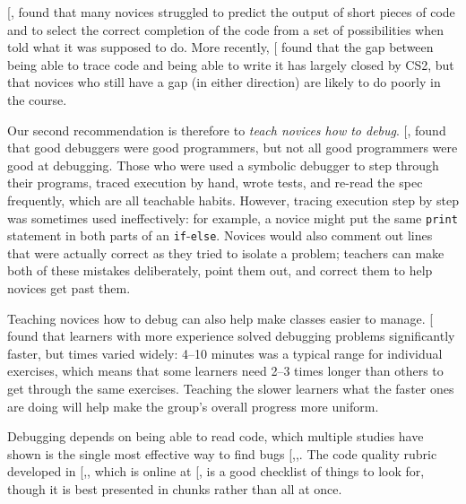 {[},\protect[\hyperlink{b:List2009}{List2009}]{]} found that many novices struggled to predict
the output of short pieces of code and to select the correct completion
of the code from a set of possibilities when told what it was supposed
to do. More recently, {[}\protect[\hyperlink{b:Harr2018}{Harr2018}]{]} found that the gap between
being able to trace code and being able to write it has largely closed
by CS2, but that novices who still have a gap (in either direction) are
likely to do poorly in the course.

Our second recommendation is therefore to \emph{teach novices how to debug}.
{[},\protect[\hyperlink{b:Murp2008}{Murp2008}]{]} found that good debuggers were good
programmers, but not all good programmers were good at debugging. Those
who were used a symbolic debugger to step through their programs, traced
execution by hand, wrote tests, and re-read the spec frequently, which
are all teachable habits. However, tracing execution step by step was
sometimes used ineffectively: for example, a novice might put the same
\texttt{print} statement in both parts of an \texttt{if}-\texttt{else}. Novices would also
comment out lines that were actually correct as they tried to isolate a
problem; teachers can make both of these mistakes deliberately, point
them out, and correct them to help novices get past them.

Teaching novices how to debug can also help make classes easier to
manage. {[}\protect[\hyperlink{b:Alqa2017}{Alqa2017}]{]} found that learners with more experience
solved debugging problems significantly faster, but times varied widely:
4--10 minutes was a typical range for individual exercises, which means
that some learners need 2--3 times longer than others to get through the
same exercises. Teaching the slower learners what the faster ones are
doing will help make the group's overall progress more uniform.

Debugging depends on being able to read code, which multiple studies
have shown is the single most effective way to find bugs
{[},,\protect[\hyperlink{b:Bacc2013}{Bacc2013}]{]}. The code
quality rubric developed in {[},\protect[\hyperlink{b:Steg2016a}{Steg2016a}]{]},
which is online at {[}\protect[\hyperlink{b:Steg2016b}{Steg2016b}]{]}, is a good checklist of things
to look for, though it is best presented in chunks rather than all at
once.


